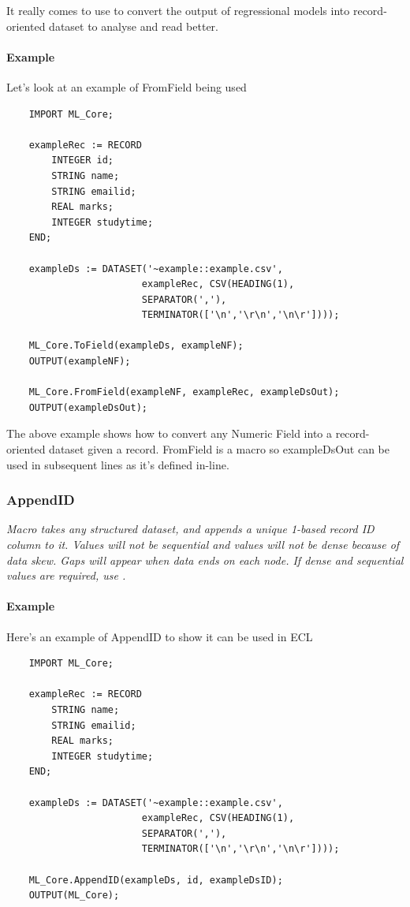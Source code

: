 \documentclass[a4paper,oneside,12pt]{book}
\begin{document}
It really comes to use to convert the output of regressional models into record-oriented dataset to analyse and read better. 

\paragraph{Example}

Let's look at an example of FromField being used

\begin{lstlisting}
    IMPORT ML_Core;
    
    exampleRec := RECORD
        INTEGER id;
        STRING name;
        STRING emailid;
        REAL marks;
        INTEGER studytime;
    END;
    
    exampleDs := DATASET('~example::example.csv', 
                        exampleRec, CSV(HEADING(1),
                        SEPARATOR(','),
                        TERMINATOR(['\n','\r\n','\n\r'])));
    
    ML_Core.ToField(exampleDs, exampleNF);
    OUTPUT(exampleNF);
    
    ML_Core.FromField(exampleNF, exampleRec, exampleDsOut);
    OUTPUT(exampleDsOut);
\end{lstlisting}

The above example shows how to convert any Numeric Field into a record-oriented dataset given a record. FromField is a macro so exampleDsOut can be used in subsequent lines as it's defined in-line.

\subsubsection{AppendID}\label{mlcore:appendid}

\textit{Macro takes any structured dataset, and appends a unique 1-based record ID column to it. Values will not be sequential and values will not be dense because of data skew. Gaps will appear when data ends on each node. If dense and sequential values are required, use .}

\paragraph{Example}

Here's an example of AppendID to show it can be used in ECL

\begin{lstlisting}
    IMPORT ML_Core;
    
    exampleRec := RECORD
        STRING name;
        STRING emailid;
        REAL marks;
        INTEGER studytime;
    END;
    
    exampleDs := DATASET('~example::example.csv', 
                        exampleRec, CSV(HEADING(1),
                        SEPARATOR(','),
                        TERMINATOR(['\n','\r\n','\n\r'])));
    
    ML_Core.AppendID(exampleDs, id, exampleDsID);
    OUTPUT(ML_Core);
\end{lstlisting}
\end{document}
